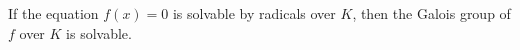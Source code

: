 If the equation $f(x) = 0$ is solvable by radicals over $K$, then the Galois group of $f$ over $K$ is solvable.
